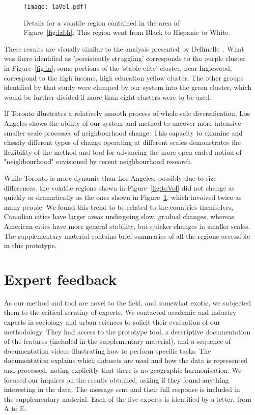 \begin{figure}
    \centering 
    \texttt{[image: laVol.pdf]}
    \caption{Details for a volatile region contained in the area of
         Figure~\ref{fig:labh}. This region went from Black to Hispanic to
        White.\label{fig:laVol}}
\end{figure}


These results are visually similar to the analysis presented by
Dellmelle~\citep{Delmelle2016}.  What was there identified as 'persistently
struggling' corresponds to the purple cluster in Figure~\ref{fig:la}; some
portions of the 'stable elite' cluster, near Inglewood, correspond to the high
income, high education yellow cluster. The other groups identified by that study
were clumped by our system into the green cluster, which would be further
divided if more than eight clusters were to be used. 

If Toronto illustrates a relatively smooth process of whole-sale
diversification, Los Angeles shows the ability of our system and method to
uncover more intensive smaller-scale processes of neighbourhood change. This
capacity to examine and classify different types of change operating at
different scales demonstrates the flexibility of the method and tool for
advancing the more open-ended notion of "neighbourhood" envisioned by recent
neighbourhood research. 



\smallskip While Toronto is more dynamic than Los Angeles, possibly due to size
differences, the volatile regions shown in Figure~\ref{fig:toVol} did not change
as quickly or dramatically as the ones shown in Figure~\ref{fig:laVol}, which
involved twice as many people. We found this trend to be related to the
countries themselves, Canadian cities have larger areas undergoing slow, gradual
changes, whereas American cities have more general stability, but quicker
changes in smaller scales. The supplementary material contains brief summaries
of all the regions accessible in this prototype.





\section{Expert feedback}
\label{sec:expert}
As our method and tool are novel to the field, and somewhat exotic,  we
subjected them to the critical scrutiny of experts. We contacted academic and
industry experts in sociology and urban sciences to solicit their evaluation of
our methodology. They had access to the prototype tool, a descriptive
documentation of the features (included in the supplementary material), and a
sequence of documentation videos illustrating how to perform specific tasks. The
documentation explains which datasets are used and how the data is represented
and processed, noting explicitly that there is no geographic harmonisation. We
focused our inquires on the results obtained, asking if they found anything
interesting in the data. The message sent and their full response is included in
the supplementary material. Each of the five experts is identified by a letter,
from A to E. 



